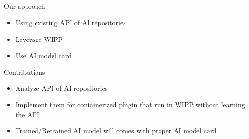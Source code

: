 \subsection{\slidetitle}
\begin{frame}
  \frametitle{\sectiontitle}
  \framesubtitle{\slidetitle}

  \begin{minipage}[h!]{0.90\textwidth}

    Our approach
    \begin{itemize}
      \item Using existing API of AI repositories
      \item Leverage WIPP
      \item Use AI model card
    \end{itemize}

    \bigskip

    Contributions
    \begin{itemize}
      \item Analyze API of AI repositories
      \item Implement them for containerized plugin that run in WIPP without learning the API
      \item Trained/Retrained AI model will comes with proper AI model card
    \end{itemize}

  \end{minipage}
\end{frame}

\def\slidetitle{Plugin concept}

